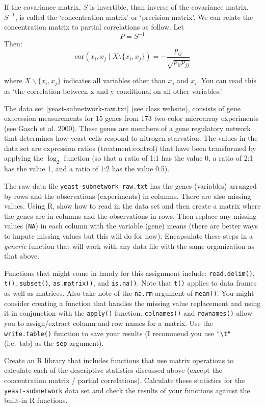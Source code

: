 If the covariance matrix, $S$ is invertible, than inverse of the
covariance matrix, $S^{-1}$, is called the `concentration matrix' or
`precision matrix'. We can relate the concentration matrix to partial
correlations as follow. Let 
\[
P = S^{-1}
\]
Then:
\[
\mbox{cor}(x_i,x_j \mid X \setminus \{x_i,x_j\}) = -\frac{p_{ij}}{\sqrt{p_{ii} p_{jj}}}
\]

where $X \backslash \{x_i,x_j\}$ indicates all variables other than
$x_j$ and $x_i$. You can read this as `the correlation between x and y
conditional on all other variables.'

\medskip
\begin{assignment}
\small
The data set |yeast-subnetwork-raw.txt| (see class website), consists of gene expression measurements
for 15 genes from 173 two-color microarray experiments (see Gasch et al.
2000). These genes are members of a gene regulatory network that determines how yeast cells
respond to nitrogen starvation. The values in the data set are
expression ratios (treatment:control) that have been transformed by
applying the $\log_2$ function (so that a ratio of 1:1 has the value 0,
a ratio of 2:1 has the value 1, and a ratio of 1:2 has the value 0.5).    
    
\par\medskip    
The raw data file
\lstinline!yeast-subnetwork-raw.txt! has the genes (variables) arranged
by rows and the observations (experiments) in columns. There are also
missing values. Using R, show how to read in the data set and then
create a matrix where the genes are in columns and the observations in
rows. Then replace any missing values (\lstinline!NA!) in each column
with the variable (gene) means (there are better ways to impute missing
values but this will do for now). Encapsulate these steps in a \emph{generic} function that will work with any data file with the same organization as that above.

\par\medskip
Functions that might come in handy for this assignment 
include: \lstinline!read.delim()!, \lstinline!t()!, \lstinline!subset()!,
\lstinline!as.matrix()!, and \lstinline!is.na()!. Note that
\lstinline!t()! applies to data frames as well as matrices. Also take
note of the \lstinline!na.rm! argument of \lstinline!mean()!. You might consider creating a function that handles the missing value
replacement and using it in conjunction with the \lstinline!apply()!
function. \lstinline!colnames()! and \lstinline!rownames()! allow you to
assign/extract column and row names for a matrix. Use the
\lstinline!write.table()! function to save your results (I recommend you
use \lstinline!"\t"! (i.e.~tab) as the \lstinline!sep! argument).
\end{assignment}


\medskip
\begin{assignment}
Create an R library that includes functions that
use matrix operations to calculate each of the descriptive statistics
discussed above (except the concentration matrix / partial
correlations). Calculate these statistics for the
\lstinline!yeast-subnetwork! data set and check the results of your
functions against the built-in R functions.
\end{assignment}

